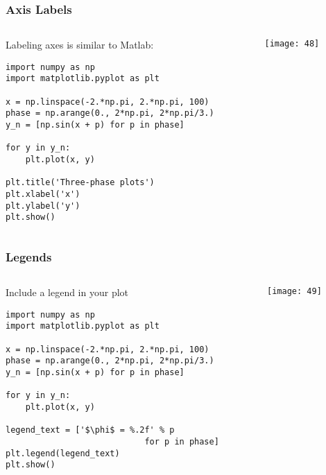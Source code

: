 \begin{frame}[fragile]\frametitle{Axis Labels}

\begin{columns}
    \begin{column}[T]{0.6\linewidth}
    Labeling axes is similar to Matlab:
    \begin{lstlisting}
import numpy as np
import matplotlib.pyplot as plt

x = np.linspace(-2.*np.pi, 2.*np.pi, 100)
phase = np.arange(0., 2*np.pi, 2*np.pi/3.)
y_n = [np.sin(x + p) for p in phase]

for y in y_n:
    plt.plot(x, y)

plt.title('Three-phase plots')
plt.xlabel('x')
plt.ylabel('y')
plt.show()
    \end{lstlisting}
	
    \end{column}
    \begin{column}[T]{0.4\linewidth}

\begin{center}
\texttt{[image: 48]}
\end{center}
    \end{column}
  \end{columns}
  
  


\end{frame}
\begin{frame}[fragile]\frametitle{Legends}


\begin{columns}
    \begin{column}[T]{0.6\linewidth}
    Include a legend in your plot
    \begin{lstlisting}
import numpy as np
import matplotlib.pyplot as plt

x = np.linspace(-2.*np.pi, 2.*np.pi, 100)
phase = np.arange(0., 2*np.pi, 2*np.pi/3.)
y_n = [np.sin(x + p) for p in phase]

for y in y_n:
    plt.plot(x, y)

legend_text = ['$\phi$ = %.2f' % p
                            for p in phase]
plt.legend(legend_text)
plt.show()
    \end{lstlisting}
	
    \end{column}
    \begin{column}[T]{0.4\linewidth}

\begin{center}
\texttt{[image: 49]}
\end{center}
    \end{column}
  \end{columns}
  
  
\end{frame}

